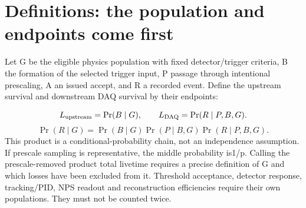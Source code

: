 \section{Definitions: the population and endpoints come first}
Let G be the eligible physics population with fixed detector/trigger criteria, B the formation of the selected trigger input, P passage through intentional prescaling, A an issued accept, and R a recorded event. Define the upstream survival and downstream DAQ survival by their endpoints:


\[
L_{\rm upstream}=\Pr(B\mid G),\qquad
L_{\rm DAQ}=\Pr(R\mid P,B,G).
\]
\[
\Pr(R\mid G)=\Pr(B\mid G)\Pr(P\mid B,G)\Pr(R\mid P,B,G).
\]
This product is a conditional-probability chain, not an independence assumption. If prescale sampling is representative, the middle probability is1/p. Calling the prescale-removed product total livetime requires a precise definition of G and which losses have been excluded from it. Threshold acceptance, detector response, tracking/PID, NPS readout and reconstruction efficiencies require their own populations. They must not be counted twice.


